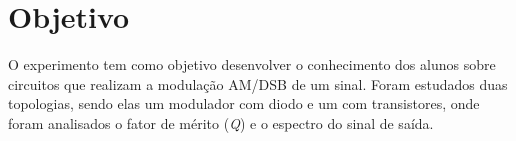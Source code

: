 \newpage

\section{Objetivo}
O experimento tem como objetivo desenvolver o conhecimento dos alunos sobre circuitos que realizam a modulação AM/DSB de um sinal. Foram estudados duas topologias, sendo elas um modulador com diodo e um com transistores, onde foram analisados o fator de mérito (\textit{Q}) e o espectro do sinal de saída.